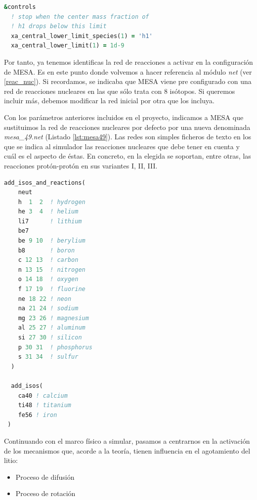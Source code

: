 \begin{lstlisting}[language=Fortran, float, caption={Parametrización de la condición de parada de la simulación cuando se produce el agotamiento de H en el núcleo de la estrella}, label={lst:stop_params}]
&controls
  ! stop when the center mass fraction of 
  ! h1 drops below this limit
  xa_central_lower_limit_species(1) = 'h1'
  xa_central_lower_limit(1) = 1d-9
\end{lstlisting}


Por tanto, ya tenemos identificas la red de reacciones a activar en la configuración de MESA. Es en este punto donde volvemos a hacer referencia al módulo \textit{net} (ver \ref{reac_nuc}). Si recordamos, se indicaba que MESA viene pre configurado con una red de reacciones nucleares en las que sólo trata con 8 isótopos. Si queremos incluir más, debemos modificar la red inicial por otra que los incluya.\par

Con los parámetros anteriores incluidos en el proyecto, indicamos a MESA que sustituimos la red de reacciones nucleares por defecto por una nueva denominada \textit{mesa\_49.net} (Listado \ref{lst:mesa49}). Las redes son simples ficheros de texto en los que se indica al simulador las reacciones nucleares que debe tener en cuenta y cuál es el aspecto de éstas. En concreto, en la elegida se soportan, entre otras, las reacciones protón-protón en sus variantes I, II, III.\par

\begin{lstlisting}[language=Fortran, float, caption={Red de reacciones mesa\_49.net. Esta red incluye un tratamiento detallado de la para los elementos ligeros H, He, Li y Be}, label={lst:mesa49}]
  add_isos_and_reactions(
    neut
    h  1  2  ! hydrogen
    he 3  4  ! helium
    li7      ! lithium
    be7
    be 9 10  ! berylium
    b8       ! boron
    c 12 13  ! carbon
    n 13 15  ! nitrogen
    o 14 18  ! oxygen
    f 17 19  ! fluorine
    ne 18 22 ! neon
    na 21 24 ! sodium
    mg 23 26 ! magnesium
    al 25 27 ! aluminum
    si 27 30 ! silicon
    p 30 31  ! phosphorus
    s 31 34  ! sulfur
  )

  add_isos(
    ca40 ! calcium
    ti48 ! titanium
    fe56 ! iron
 )
\end{lstlisting}


Continuando con el marco físico a simular, pasamos a centrarnos en la activación de los mecanismos que, acorde a la teoría, tienen influencia en el agotamiento del litio:
\begin{itemize}
    \item Proceso de difusión
    \item Proceso de rotación
\end{itemize}

